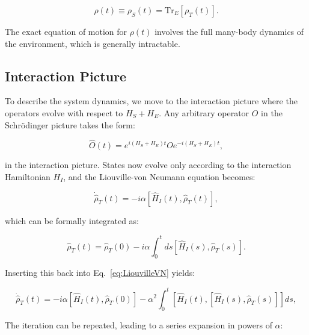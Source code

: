 \begin{equation}
	\rho(t) \equiv \rho_S(t)= \mathrm{Tr}_E[\rho_T(t)].
	\label{eq:Reduced_Density_Matrix}
\end{equation}

\noindent
The exact equation of motion for $\rho(t)$ involves the full many-body dynamics of the environment, which is generally intractable.



\subsection{Interaction Picture}

\noindent
To describe the system dynamics, we move to the interaction picture where the operators evolve with respect to $H_S + H_E$. Any arbitrary operator $O$ in the Schrödinger picture takes the form:

\begin{equation}
	\hat{O}(t) = e^{i(H_S+H_E)t} O e^{-i(H_S+H_E)t},
	\label{eq:Interaction_Picture_Operators}
\end{equation}

\noindent
in the interaction picture. States now evolve only according to the interaction Hamiltonian $H_I$, and the Liouville-von Neumann equation becomes:

\begin{equation}
	\dot{\hat{\rho}}_T(t) = -i \alpha [\hat{H}_I(t), \hat{\rho}_T(t)],
	\label{eq:LiouvilleVN}
\end{equation}

\noindent
which can be formally integrated as:

\begin{equation}
	\hat{\rho}_T(t) = \hat{\rho}_T(0) - i \alpha \int_0^t ds [\hat{H}_I(s), \hat{\rho}_T(s)].
	\label{eq:Formal_Integration}
\end{equation}

\noindent
Inserting this back into Eq.~\eqref{eq:LiouvilleVN} yields:

\begin{equation}
	\dot{\hat{\rho}}_T(t) = -i \alpha \left[ \hat{H}_I(t), \hat{\rho}_T(0) \right]
	- \alpha^2 \int_0^t \left[ \hat{H}_I(t), \left[ \hat{H}_I(s), \hat{\rho}_T(s) \right] \right] ds,
	\label{eq:Second_Order_Expansion}
\end{equation}

\noindent
The iteration can be repeated, leading to a series expansion in powers of $\alpha$:

